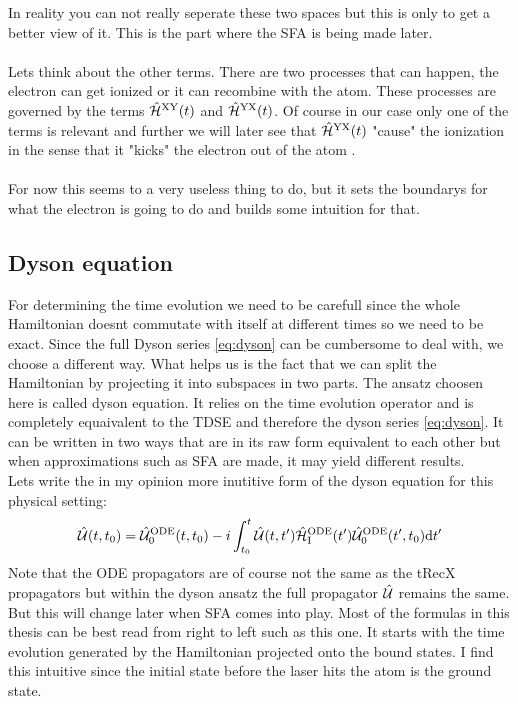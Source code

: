 In reality you can not really seperate these two spaces but this is only to get a better view of it.
This is the part where the SFA is being made later.\\\\
Lets think about the other terms. 
There are two processes that can happen, the electron can get ionized or it can recombine with the atom.
These processes are governed by the terms $\hat{\mathcal{H}}^{\mathrm{XY}}(t)$ and $\hat{\mathcal{H}}^{\mathrm{YX}}(t)$.
Of course in our case only one of the terms is relevant and further we will later see that $\hat{\mathcal{H}}^{\mathrm{YX}}(t)$ "cause" the ionization in the sense that it "kicks" the electron out of the atom \cite{Ivanov20012005}.\\\\

For now this seems to a very useless thing to do, but it sets the boundarys for what the electron is going to do and builds some intuition for that.





\subsection{Dyson equation}
For determining the time evolution we need to be carefull since the whole Hamiltonian doesnt commutate with itself at different times so we need to be exact. 
Since the full Dyson series \eqref{eq:dyson} can be cumbersome to deal with, we choose a different way. 
What helps us is the fact that we can split the Hamiltonian by projecting it into subspaces in two parts. 
The ansatz choosen here is called dyson equation. 
It relies on the time evolution operator and is completely equaivalent to the TDSE and therefore the dyson series \eqref{eq:dyson}.
It can be written in two ways that are in its raw form equivalent to each other but when approximations such as SFA are made, it may yield different results.\\

Lets write the in my opinion more inutitive form of the dyson equation for this physical setting:
\begin{equation}
    \hat{\mathcal{U}}(t,t_0)=\hat{\mathcal{U}}^{\mathrm{ODE}}_0(t,t_0)-i\int_{t_0}^{t} \hat{\mathcal{U}}(t,t')\hat{\mathcal{H}}^{\mathrm{ODE}}_{\mathrm{I}}(t')\hat{\mathcal{U}}^{\mathrm{ODE}}_0(t',t_0) \mathrm{d} t'       \label{eq:dysonAnsatz}
\end{equation}
Note that the ODE propagators are of course not the same as the tRecX propagators but within the dyson ansatz the full propagator $\hat{\mathcal{U}}$ remains the same.
But this will change later when SFA comes into play.
Most of the formulas in this thesis can be best read from right to left such as this one.
It starts with the time evolution generated by the Hamiltonian projected onto the bound states. 
I find this intuitive since the initial state before the laser hits the atom is the ground state.\\

